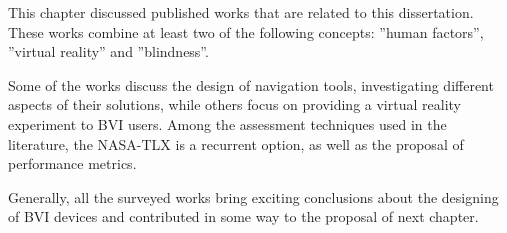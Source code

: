 This chapter discussed published works that are related to this dissertation. These works combine at least two of the following concepts: ”human factors”, ”virtual reality” and ”blindness”. 

Some of the works discuss the design of navigation tools, investigating different aspects of their solutions, while others focus on providing a virtual reality experiment to BVI users. Among the assessment techniques used in the literature, the NASA-TLX is a recurrent option, as well as the proposal of performance metrics.

Generally, all the surveyed works bring exciting conclusions about the designing of BVI devices and contributed in some way to the proposal of next chapter.


